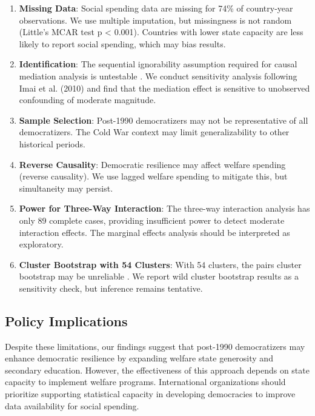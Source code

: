 \documentclass[11pt,letterpaper]{article}
\begin{document}
\begin{enumerate}
  \item \textbf{Missing Data}: Social spending data are missing for 74\% of country-year observations. We use multiple imputation, but missingness is not random (Little's MCAR test p < 0.001). Countries with lower state capacity are less likely to report social spending, which may bias results.

  \item \textbf{Identification}: The sequential ignorability assumption required for causal mediation analysis is untestable \cite{Imai2010}. We conduct sensitivity analysis following Imai et al. (2010) and find that the mediation effect is sensitive to unobserved confounding of moderate magnitude.

  \item \textbf{Sample Selection}: Post-1990 democratizers may not be representative of all democratizers. The Cold War context may limit generalizability to other historical periods.

  \item \textbf{Reverse Causality}: Democratic resilience may affect welfare spending (reverse causality). We use lagged welfare spending to mitigate this, but simultaneity may persist.

  \item \textbf{Power for Three-Way Interaction}: The three-way interaction analysis has only 89 complete cases, providing insufficient power to detect moderate interaction effects. The marginal effects analysis should be interpreted as exploratory.

  \item \textbf{Cluster Bootstrap with 54 Clusters}: With 54 clusters, the pairs cluster bootstrap may be unreliable \cite{Cameron2015}. We report wild cluster bootstrap results as a sensitivity check, but inference remains tentative.
\end{enumerate}

\subsection{Policy Implications}

Despite these limitations, our findings suggest that post-1990 democratizers may enhance democratic resilience by expanding welfare state generosity and secondary education. However, the effectiveness of this approach depends on state capacity to implement welfare programs. International organizations should prioritize supporting statistical capacity in developing democracies to improve data availability for social spending.
\end{document}
